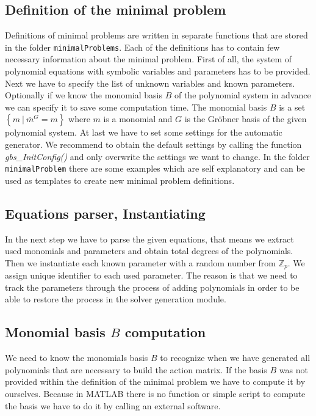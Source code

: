 \subsection{Definition of the minimal problem}
Definitions of minimal problems are written in separate functions that are stored in the folder \texttt{minimalProblems}. Each of the definitions has to contain few necessary information about the minimal problem. First of all, the system of polynomial equations with symbolic variables and parameters has to be provided. Next we have to specify the list of unknown variables and known parameters. Optionally if we know the monomial basis $B$ of the polynomial system in advance we can specify it to save some computation time. The monomial basis $B$ is a set $\left\{m\ |\ \overline{m}^G = m\right\}$ where $m$ is a monomial and $G$ is the Gr\"obner basis of the given polynomial system. At last we have to set some settings for the automatic generator. We recommend to obtain the default settings by calling the function \textit{gbs\_InitConfig()} and only overwrite the settings we want to change. In the folder \texttt{minimalProblem} there are some examples which are self explanatory and can be used as templates to create new minimal problem definitions.

\subsection{Equations parser, Instantiating}
In the next step we have to parse the given equations, that means we extract used monomials and parameters and obtain total degrees of the polynomials. Then we instantiate each known parameter with a random number from $\mathbb{Z}_p$. We assign unique identifier to each used parameter. The reason is that we need to track the parameters through the process of adding polynomials in order to be able to restore the process in the solver generation module.

\subsection{Monomial basis $B$ computation}
We need to know the monomials basis $B$ to recognize when we have generated all polynomials that are necessary to build the action matrix. If the basis $B$ was not provided within the definition of the minimal problem we have to compute it by ourselves. Because in MATLAB there is no function or simple script to compute the basis we have to do it by calling an external software.

